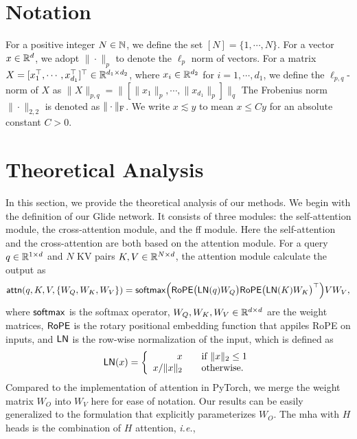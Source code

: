 \section{Notation}
For a positive integer $N\in\mathbb{N}$, we define the set $[N]=\{1,\cdots,N\}$. For a vector $x\in\mathbb{R}^{d}$, we adopt $\|\cdot\|_{p}$ to denote the $\ell_{p}$ norm of vectors. For a matrix $X=[x_{1}^{\top},\cdots,x_{d_{1}}^{\top}]^{\top}\in\mathbb{R}^{d_{1}\times d_{2}}$, where $x_{i}\in\mathbb{R}^{d_{2}}$ for $i=1,\cdots,d_{1}$, we define the $\ell_{p,q}$-norm of $X$ as $\|X\|_{p,q}=\|[\|x_{1}\|_{p},\cdots,\|x_{d_{1}}\|_{p}]\|_{q}$ The Frobenius norm $\|\cdot\|_{2,2}$ is denoted as $\|\cdot\|_{\mathrm{F}}$. We write $x\lesssim y$ to mean $x\leq Cy$ for an absolute constant $C>0$. 

\section{Theoretical Analysis}\label{app:theory}
In this section, we provide the theoretical analysis of our methods. We begin with the definition of our Glide network. It consists of three modules: the self-attention module, the cross-attention module, and the \ac{ff} module. Here the self-attention and the cross-attention are both based on the attention module. For a query $q\in\mathbb{R}^{1\times d}$ and $N$ KV pairs $K,V\in\mathbb{R}^{N\times d}$, the attention module calculate the output as 
\begin{align}
    \mathsf{attn}(q,K,V, \{W_Q,W_K,W_V\}) = \mathsf{softmax}\Big(\mathsf{RoPE}\big(\mathsf{LN}(q) W_Q \big) \mathsf{RoPE}\big(\mathsf{LN}(K) W_K\big)^{\top}\Big)V W_{V},\label{eq:att}
\end{align}
where $\mathsf{softmax}$ is the softmax operator, $W_Q,W_K,W_V\in\mathbb{R}^{d\times d}$ are the weight matrices, $\mathsf{RoPE}$ is the rotary positional embedding function that appiles RoPE on inputs, and $\mathsf{LN}$ is the row-wise normalization of the input, which is defined as
\begin{align*}
    \mathsf{LN}(x)= 
    \left\{
\begin{array}{rcl}
x       &      & {\text{if } \|x\|_{2}\leq 1}\\
x/\|x\|_{2}    &      & {\text{otherwise}}.
\end{array} \right.
\end{align*}
Compared to the implementation of attention in PyTorch, we merge the weight matrix $W_O$ into $W_V$ here for ease of notation. Our results can be easily generalized to the formulation that explicitly parameterizes $W_O$. The \ac{mha} with $H$ heads is the combination of $H$ attention, \emph{i.e.}, 
